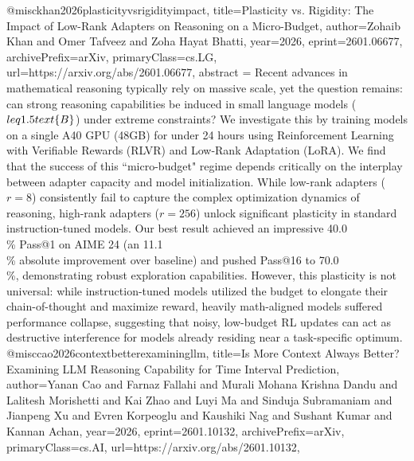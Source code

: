 {}@misc{khan2026plasticityvsrigidityimpact,
      title={Plasticity vs. Rigidity: The Impact of Low-Rank Adapters on Reasoning on a Micro-Budget}, 
      author={Zohaib Khan and Omer Tafveez and Zoha Hayat Bhatti},
      year={2026},
      eprint={2601.06677},
      archivePrefix={arXiv},
      primaryClass={cs.LG},
      url={https://arxiv.org/abs/2601.06677},
      abstract = {Recent advances in mathematical reasoning typically rely on massive scale, yet the question remains: can strong reasoning capabilities be induced in small language models ($\\leq1.5\\text\{B\}$) under extreme constraints? We investigate this by training models on a single A40 GPU (48GB) for under 24 hours using Reinforcement Learning with Verifiable Rewards (RLVR) and Low-Rank Adaptation (LoRA). We find that the success of this ``micro-budget" regime depends critically on the interplay between adapter capacity and model initialization. While low-rank adapters ($r=8$) consistently fail to capture the complex optimization dynamics of reasoning, high-rank adapters ($r=256$) unlock significant plasticity in standard instruction-tuned models. Our best result achieved an impressive 40.0\\\% Pass@1 on AIME 24 (an 11.1\\\% absolute improvement over baseline) and pushed Pass@16 to 70.0\\\%, demonstrating robust exploration capabilities. However, this plasticity is not universal: while instruction-tuned models utilized the budget to elongate their chain-of-thought and maximize reward, heavily math-aligned models suffered performance collapse, suggesting that noisy, low-budget RL updates can act as destructive interference for models already residing near a task-specific optimum.}
}@misc{cao2026contextbetterexaminingllm,
      title={Is More Context Always Better? Examining LLM Reasoning Capability for Time Interval Prediction}, 
      author={Yanan Cao and Farnaz Fallahi and Murali Mohana Krishna Dandu and Lalitesh Morishetti and Kai Zhao and Luyi Ma and Sinduja Subramaniam and Jianpeng Xu and Evren Korpeoglu and Kaushiki Nag and Sushant Kumar and Kannan Achan},
      year={2026},
      eprint={2601.10132},
      archivePrefix={arXiv},
      primaryClass={cs.AI},
      url={https://arxiv.org/abs/2601.10132},
}

